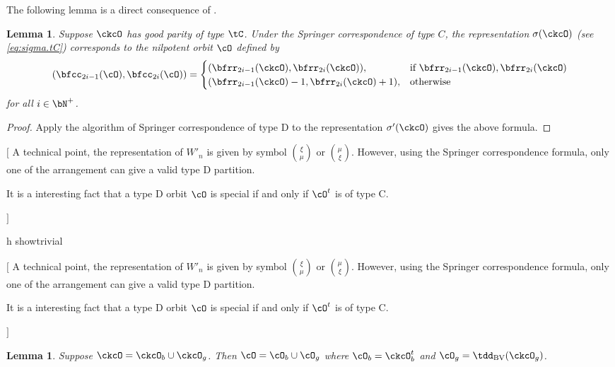 \documentclass[12pt,a4paper]{amsart}
\newcommand{\trivial}[2][]{\if\relax\detokenize{#1}\relax
  {%
      \color{orange} \vspace{0em} $[$  #2 $]$
      \color{black}
  }
  \else
\ifx#1h
\ifcsname showtrivial\endcsname
{%
    \color{orange} \vspace{0em}  $[$ #2 $]$
    \color{black}
}
\fi
\else {\red Wrong argument!} \fi
\fi
}
\numberwithin{equation}{section}
\newtheorem{lem}[thm]{Lemma}
\theoremstyle{remark}
\def\tdBV{\tdd_{\text{BV}}}
\begin{document}
The following lemma is a direct consequence of .
\begin{lem}
  Suppose $\ckcO$ has good parity of type $\tC$. Under the Springer
  correspondence of type $C$, the representation $\sigma(\ckcO)$ (see
  \eqref{eq:sigma.tC}) corresponds to the nilpotent orbit $\cO$ defined by
  \[
    (\bfcc_{2i-1}(\cO),\bfcc_{2i}(\cO)) =\begin{cases}
      (\bfrr_{2i-1}(\ckcO),\bfrr_{2i}(\ckcO)), & \text{if } \bfrr_{2i-1}(\ckcO),\bfrr_{2i}(\ckcO)\\
      (\bfrr_{2i-1}(\ckcO)-1,\bfrr_{2i}(\ckcO)+1), & \text{otherwise} \\
    \end{cases}
  \]
  for all $i\in \bN^+$.
\end{lem}
\begin{proof}
  Apply the algorithm of Springer correspondence of type D to the representation $\sigma'(\ckcO)$ gives the above formula.
\end{proof}
\trivial{
A technical point, the representation of $W'_n$ is given by symbol $\binom{\xi}{\mu}$ or
$\binom{\mu}{\xi}$. However, using the Springer correspondence formula, only one of the arrangement
can give a valid type D partition.

It is a interesting fact that a type D orbit $\cO$ is special if and only if $\cO^t$ is of type C.



}



\begin{lem}
Suppose $\ckcO = \ckcO_{b}\cup \ckcO_{g}$.
Then $\cO = \cO_{b} \cup \cO_{g}$ where $\cO_{b} = \ckcO_{b}^{t}$ and
$\cO_{g}=\tdBV(\ckcO_{g})$.
\end{lem}

\end{document}
